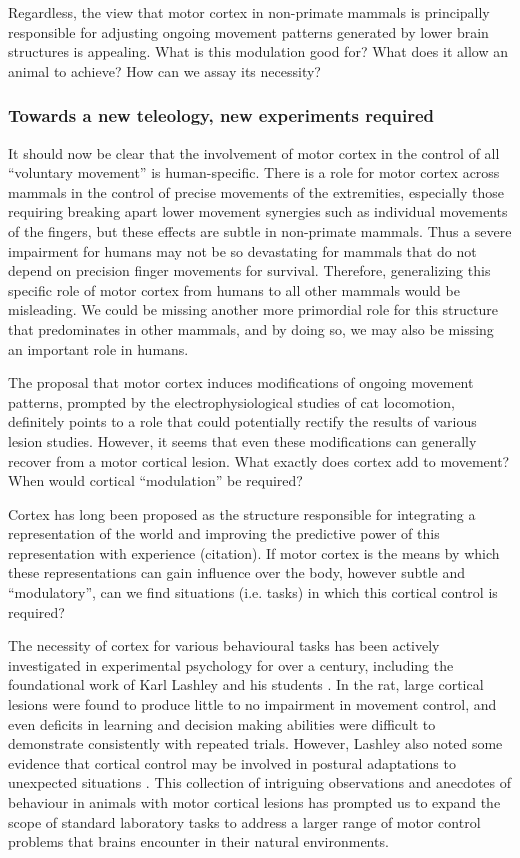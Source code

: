 Regardless, the view that motor cortex in non-primate mammals is principally responsible for adjusting ongoing movement patterns generated by lower brain structures is appealing. What is this modulation good for? What does it allow an animal to achieve? How can we assay its necessity?

\subsubsection*{Towards a new teleology, new experiments required}

It should now be clear that the involvement of motor cortex in the control of all ``voluntary movement'' is human-specific. There is a role for motor cortex across mammals in the control of precise movements of the extremities, especially those requiring breaking apart lower movement synergies such as individual movements of the fingers, but these effects are subtle in non-primate mammals. Thus a severe impairment for humans may not be so devastating for mammals that do not depend on precision finger movements for survival. Therefore, generalizing this specific role of motor cortex from humans to all other mammals would be misleading. We could be missing another more primordial role for this structure that predominates in other mammals, and by doing so, we may also be missing an important role in humans.

The proposal that motor cortex induces modifications of ongoing movement patterns, prompted by the electrophysiological studies of cat locomotion, definitely points to a role that could potentially rectify the results of various lesion studies. However, it seems that even these modifications can generally recover from a motor cortical lesion. What exactly does cortex add to movement? When would cortical ``modulation'' be required?

Cortex has long been proposed as the structure responsible for integrating a representation of the world and improving the predictive power of this representation with experience (citation). If motor cortex is the means by which these representations can gain influence over the body, however subtle and ``modulatory'', can we find situations (i.e. tasks) in which this cortical control is required?

The necessity of cortex for various behavioural tasks has been actively investigated in experimental psychology for over a century, including the foundational work of Karl Lashley and his students \cite{Lashley1950a}. In the rat, large cortical lesions were found to produce little to no impairment in movement control, and even deficits in learning and decision making abilities were difficult to demonstrate consistently with repeated trials. However, Lashley also noted some evidence that cortical control may be involved in postural adaptations to unexpected situations \cite{Lashley1921a}. This collection of intriguing observations and anecdotes of behaviour in animals with motor cortical lesions has prompted us to expand the scope of standard laboratory tasks to address a larger range of motor control problems that brains encounter in their natural environments.

